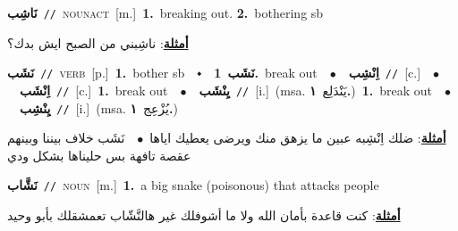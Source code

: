 \documentclass[10pt,a4paper,twoside]{article} %
\begin{document}
\begin{multicols}{2}
{\setlength\topsep{0pt}\textbf{\foreignlanguage{arabic}{نَاشِب}}\ {\color{gray}\texttt{//}\color{black}}\ \textsc{noun\textunderscore act}\ [m.]\ \textbf{1.}~breaking out.  \textbf{2.}~bothering sb\  \begin{flushright}\color{gray}\foreignlanguage{arabic}{\textbf{\underline{\foreignlanguage{arabic}{أمثلة}}}: ناشِبني من الصبح ايش بدك؟}\end{flushright}\color{black}} \vspace{2mm}

{\setlength\topsep{0pt}\textbf{\foreignlanguage{arabic}{نَشَب}}\ {\color{gray}\texttt{//}\color{black}}\ \textsc{verb}\ [p.]\ \textbf{1.}~bother sb\ \ $\smblkdiamond$\ \ \setlength\topsep{0pt}\textbf{\foreignlanguage{arabic}{نَشَب}}\ \textbf{1.}~break out\ \ $\bullet$\ \ \setlength\topsep{0pt}\textbf{\foreignlanguage{arabic}{اِنْشِب}}\ {\color{gray}\texttt{//}\color{black}}\ [c.]\ \ $\bullet$\ \ \setlength\topsep{0pt}\textbf{\foreignlanguage{arabic}{اِنْشَب}}\ {\color{gray}\texttt{//}\color{black}}\ [c.]\ \textbf{1.}~break out\ \ $\bullet$\ \ \setlength\topsep{0pt}\textbf{\foreignlanguage{arabic}{يِنْشَب}}\ {\color{gray}\texttt{//}\color{black}}\ [i.]\ \color{gray}(msa. \foreignlanguage{arabic}{يَنْدَلِع}~\foreignlanguage{arabic}{\textbf{١.}})\color{black}\ \textbf{1.}~break out\ \ $\bullet$\ \ \setlength\topsep{0pt}\textbf{\foreignlanguage{arabic}{يِنْشِب}}\ {\color{gray}\texttt{//}\color{black}}\ [i.]\ \color{gray}(msa. \foreignlanguage{arabic}{يُزْعِج}~\foreignlanguage{arabic}{\textbf{١.}})\color{black}\  \begin{flushright}\color{gray}\foreignlanguage{arabic}{\textbf{\underline{\foreignlanguage{arabic}{أمثلة}}}: ضلك اِنْشِبه عبين ما يزهق منك ويرضى يعطيك اياها\ $\bullet$\ \  نَشَب خلاف بيننا وبينهم عقصة تافهة بس حليناها بشكل ودي}\end{flushright}\color{black}} \vspace{2mm}

{\setlength\topsep{0pt}\textbf{\foreignlanguage{arabic}{نَشَّاب}}\ {\color{gray}\texttt{//}\color{black}}\ \textsc{noun}\ [m.]\ \textbf{1.}~a big snake (poisonous) that attacks people\  \begin{flushright}\color{gray}\foreignlanguage{arabic}{\textbf{\underline{\foreignlanguage{arabic}{أمثلة}}}: كنت قاعدة بأمان الله ولا ما أشوفلك غير هالنَّشّاب تعمشقلك بأبو وحيد}\end{flushright}\color{black}} \vspace{2mm}


\end{multicols}
\end{document}
